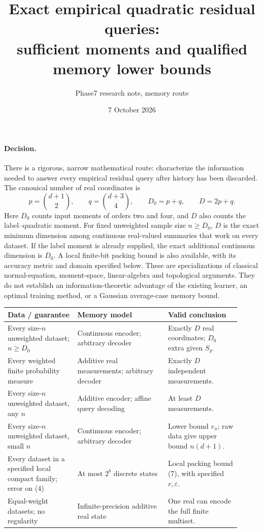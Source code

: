 \documentclass[11pt]{article}
\title{Exact empirical quadratic residual queries:\\sufficient moments and qualified memory lower bounds}
\author{Phase7 research note, memory route}
\date{7 October 2026}
\begin{document}
\maketitle

\paragraph{Decision.}
There is a rigorous, narrow mathematical route: characterize the information
needed to answer every empirical residual query after history has been
discarded.  The canonical number of real coordinates is
\[
 p=\binom{d+1}{2},\qquad q=\binom{d+3}{4},\qquad
 D_0=p+q,\qquad D=2p+q.
\]
Here $D_0$ counts input moments of orders two and four, and $D$ also counts
the label--quadratic moment.  For fixed unweighted sample size $n\ge D_0$,
$D$ is the exact minimum dimension among continuous real-valued summaries
that work on every dataset. If the label moment is already supplied,
the exact additional continuous dimension is $D_0$. A local finite-bit
packing bound is also available, with its accuracy metric and domain
specified below. These are specializations of classical normal-equation,
moment-space, linear-algebra and topological arguments. They do not
establish an information-theoretic advantage of the existing learner,
an optimal training method, or a Gaussian average-case memory bound.

\begin{center}
\small
\begin{tabular}{>{\raggedright\arraybackslash}p{0.27\linewidth}>{\raggedright\arraybackslash}p{0.35\linewidth}>{\raggedright\arraybackslash}p{0.29\linewidth}}
\toprule
Data / guarantee & Memory model & Valid conclusion\\
\midrule
Every size-$n$ unweighted dataset; $n\ge D_0$
& Continuous encoder; arbitrary decoder
& Exactly $D$ real coordinates; $D_0$ extra given $S_y$.\\[3pt]
Every weighted finite probability measure
& Additive real measurements; arbitrary decoder
& Exactly $D$ independent measurements.\\[3pt]
Every size-$n$ unweighted dataset, any $n$
& Additive encoder; affine query decoding
& At least $D$ measurements.\\[3pt]
Every size-$n$ unweighted dataset, small $n$
& Continuous encoder; arbitrary decoder
& Lower bound $r_n$; raw data give upper bound $n(d+1)$.\\[3pt]
Every dataset in a specified local compact family; error on (4)
& At most $2^b$ discrete states
& Local packing bound (7), with specified $r,\varepsilon$.\\[3pt]
Equal-weight datasets; no regularity
& Infinite-precision additive real state
& One real can encode the full finite multiset.\\
\bottomrule
\end{tabular}
\end{center}
\end{document}
